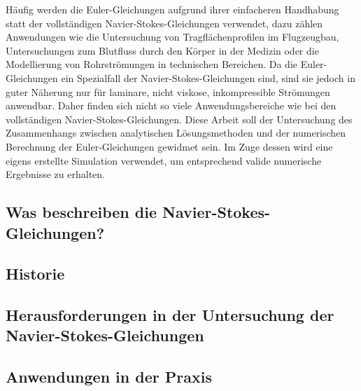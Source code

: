 Häufig werden die Euler-Gleichungen aufgrund ihrer einfacheren Handhabung statt der vollständigen Navier-Stokes-Gleichungen verwendet, dazu zählen Anwendungen wie die Untersuchung von Tragflächenprofilen im Flugzeugbau, Untersuchungen zum Blutfluss durch den Körper in der Medizin oder die Modellierung von Rohrströmungen in technischen Bereichen. Da die Euler-Gleichungen ein Spezialfall der Navier-Stokes-Gleichungen sind, sind sie jedoch in guter Näherung nur für laminare, nicht viskose, inkompressible Strömungen anwendbar. Daher finden sich nicht so viele Anwendungsbereiche wie bei den vollständigen Navier-Stokes-Gleichungen. Diese Arbeit soll der Untersuchung des Zusammenhangs zwischen analytischen Lösungsmethoden und der numerischen Berechnung der Euler-Gleichungen gewidmet sein. Im Zuge dessen wird eine eigens erstellte Simulation verwendet, um entsprechend valide numerische Ergebnisse zu erhalten.

\subsection{Was beschreiben die Navier-Stokes-Gleichungen?}

\subsection{Historie}

\subsection{Herausforderungen in der Untersuchung der Navier-Stokes-Gleichungen}

\subsection{Anwendungen in der Praxis}